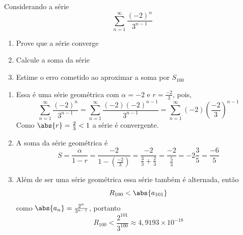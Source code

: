\documentclass[a4paper,12pt,fleqn]{article}
\begin{document}
Considerando a série
\[
  \sum_{n=1}^{\infty} \frac{(-2)^n}{3^{n-1}}
\]
\begin{enumerate}[label=\alph*)]
  \item Prove que a série converge
  \item Calcule a soma da série
  \item Estime o erro cometido ao aproximar a soma por \(S_{100}\)
\end{enumerate}

\begin{answer}
\begin{enumerate}[label=\alph*)]
  \item Essa é uma série geométrica com
    \(\alpha = -2\) e
    \(r=\frac{-2}{3}\),
    pois,
    \[
      \sum_{n=1}^{\infty} \frac{(-2)^n}{3^{n-1}}
      = \sum_{n=1}^{\infty} \frac{(-2)(-2)^{n-1}}{3^{n-1}}
      = \sum_{n=1}^{\infty} (-2)\left(\frac{-2}{3}\right)^{n-1}
    \]
    Como
    \(\abs{r} = \frac{2}{3} < 1\)
    a série é convergente.
  \item
    A soma da série geométrica é
    \[
      S
      = \frac{\alpha}{1-r}
      = \frac{-2}{1-\left(\frac{-2}{3}\right)}
      = \frac{-2}{\frac{3}{3}+\frac{2}{3}}
      = \frac{-2}{\frac{5}{3}}
      = -2\frac{3}{5}
      = \frac{-6}{5}
    \]
  \item Além de ser uma série geométrica essa série também é alternada, então
  \[
    R_{100} < \abs{a_{101}}
  \]
  como \(\abs{a_n}=\frac{2^n}{3^{n-1}}\), portanto
  \[
    R_{100} < \frac{2^{101}}{3^{100}}
    \approx 4,9193 \times 10^{-18}
  \]
\end{enumerate}
\end{answer}

\end{document}
